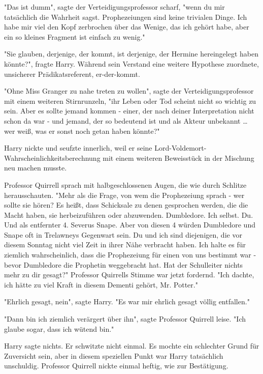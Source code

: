 {"Das ist dumm", sagte der Verteidigungsprofessor scharf, "wenn du mir tatsächlich die Wahrheit sagst. Prophezeiungen sind keine trivialen Dinge. Ich habe mir viel den Kopf zerbrochen über das Wenige, das ich gehört habe, aber ein so kleines Fragment ist einfach zu wenig."

"Sie glauben, derjenige, der kommt, ist derjenige, der Hermine hereingelegt haben könnte?", fragte Harry. Während sein Verstand eine weitere Hypothese zuordnete, unsicherer Prädikatsreferent, er-der-kommt.

"Ohne Miss Granger zu nahe treten zu wollen", sagte der Verteidigungsprofessor mit einem weiteren Stirnrunzeln, "ihr Leben oder Tod scheint nicht so wichtig zu sein. Aber es sollte jemand kommen - einer, der nach deiner Interpretation nicht schon da war - und jemand, der so bedeutend ist und als Akteur unbekannt … wer weiß, was er sonst noch getan haben könnte?"

Harry nickte und seufzte innerlich, weil er seine Lord-Voldemort-Wahrscheinlichkeitsberechnung mit einem weiteren Beweisstück in der Mischung neu machen musste.

Professor Quirrell sprach mit halbgeschlossenen Augen, die wie durch Schlitze herausschauten. "Mehr als die Frage, von wem die Prophezeiung sprach - wer sollte sie hören? Es heißt, dass Schicksale zu denen gesprochen werden, die die Macht haben, sie herbeizuführen oder abzuwenden. Dumbledore. Ich selbst. Du. Und als entfernter 4. Severus Snape. Aber von diesen 4 würden Dumbledore und Snape oft in Trelawneys Gegenwart sein. Du und ich sind diejenigen, die vor diesem Sonntag nicht viel Zeit in ihrer Nähe verbracht haben. Ich halte es für ziemlich wahrscheinlich, dass die Prophezeiung für einen von uns bestimmt war - bevor Dumbledore die Prophetin weggebracht hat. Hat der Schulleiter nichts mehr zu dir gesagt?" Professor Quirrells Stimme war jetzt fordernd. "Ich dachte, ich hätte zu viel Kraft in diesem Dementi gehört, Mr. Potter."

"Ehrlich gesagt, nein", sagte Harry. "Es war mir ehrlich gesagt völlig entfallen."

"Dann bin ich ziemlich verärgert über ihn", sagte Professor Quirrell leise. "Ich glaube sogar, dass ich wütend bin."

Harry sagte nichts. Er schwitzte nicht einmal. Es mochte ein schlechter Grund für Zuversicht sein, aber in diesem speziellen Punkt war Harry tatsächlich unschuldig. Professor Quirrell nickte einmal heftig, wie zur Bestätigung.

}
